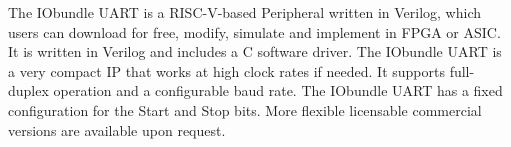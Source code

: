 The IObundle UART is a RISC-V-based Peripheral written in Verilog, which users
can download for free, modify, simulate and implement in FPGA or ASIC. It is
written in Verilog and includes a C software driver. The IObundle UART is a very
compact IP that works at high clock rates if needed. It supports full-duplex
operation and a configurable baud rate. The IObundle UART has a fixed
configuration for the Start and Stop bits. More flexible licensable commercial
versions are available upon request.


